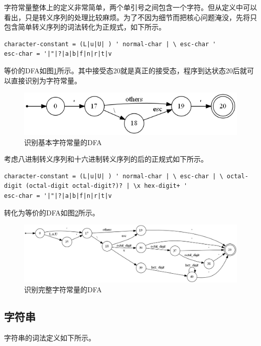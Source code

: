 \documentclass[UTF8, twoside, titlepage]{ctexart}
\begin{document}
字符常量整体上的定义非常简单，两个单引号之间包含一个字符。但从定义中可以看出，只是转义序列的处理比较麻烦。为了不因为细节而把核心问题淹没，先将只包含简单转义序列的词法转化为正规式，如下所示。

\begin{lstlisting}
character-constant = (L|u|U| ) ' normal-char | \ esc-char '
esc-char = '|"|?|a|b|f|n|r|t|v
\end{lstlisting}

等价的DFA如图\ref{fig:char}所示。其中接受态20就是真正的接受态，程序到达状态20后就可以直接识别为字符常量。

\begin{figure}[htbp]
	\centering
	\includegraphics[scale=0.54]{images/char.png}
	\caption{识别基本字符常量的DFA}
	\label{fig:char}
\end{figure}

考虑八进制转义序列和十六进制转义序列的后的正规式如下所示。

\begin{lstlisting}
character-constant = (L|u|U| ) ' normal-char | \ esc-char | \ octal-digit (octal-digit octal-digit?)? | \x hex-digit+ '
esc-char = '|"|?|a|b|f|n|r|t|v
\end{lstlisting}

转化为等价的DFA如图\ref{fig:char2}所示。

\begin{figure}[htbp]
	\centering
	\includegraphics[width=\textwidth]{images/char2.png}
	\caption{识别完整字符常量的DFA}
	\label{fig:char2}
\end{figure}

\subsection{字符串}
字符串的词法定义如下所示。
\end{document}
